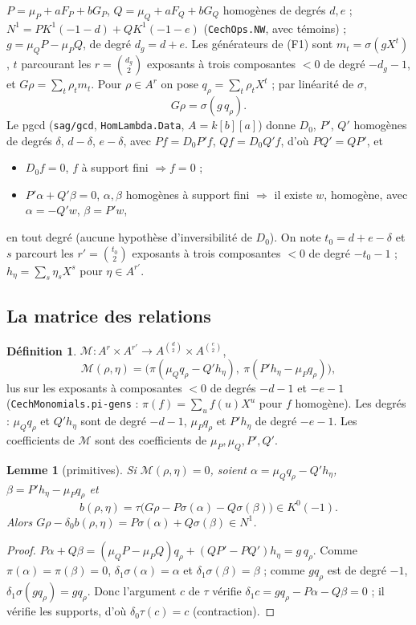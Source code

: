 \documentclass[11pt]{amsart}
\newtheorem{lemma}[theorem]{Lemme}
\theoremstyle{definition}
\newtheorem{definition}[theorem]{Définition}
\theoremstyle{remark}
\begin{document}
$P=\mu_P+aF_P+bG_P$, $Q=\mu_Q+aF_Q+bG_Q$ homogènes de degrés $d,e$ ;
$N^1=PK^1(-1-d)+QK^1(-1-e)$ (\texttt{CechOps.NW}, avec témoins) ;
$g=\mu_QP-\mu_PQ$, de degré $d_g=d+e$. Les générateurs de (F1) sont
$m_t=\sigma(gX^t)$, $t$ parcourant les $r=\binom{d_g}2$ exposants à trois
composantes $<0$ de degré $-d_g-1$, et $G\rho=\sum_t\rho_tm_t$. Pour
$\rho\in A^r$ on pose $q_\rho=\sum_t\rho_tX^t$ ; par linéarité de $\sigma$,
\[G\rho=\sigma(g\,q_\rho).\]
Le pgcd (\texttt{sag/gcd}, \texttt{HomLambda.Data}, $A=k[b][a]$) donne
$D_0$, $P'$, $Q'$ homogènes de degrés $\delta$, $d-\delta$, $e-\delta$,
avec $Pf=D_0P'f$, $Qf=D_0Q'f$, d'où $PQ'=QP'$, et
\begin{itemize}
\item[(S0)] $D_0f=0$, $f$ à support fini $\Rightarrow f=0$ ;
\item[(S1)] $P'\alpha+Q'\beta=0$, $\alpha,\beta$ homogènes à support fini
  $\Rightarrow$ il existe $w$, homogène, avec $\alpha=-Q'w$, $\beta=P'w$,
\end{itemize}
en tout degré (aucune hypothèse d'inversibilité de $D_0$). On note
$t_0=d+e-\delta$ et $s$ parcourt les $r'=\binom{t_0}2$ exposants à trois
composantes $<0$ de degré $-t_0-1$ ; $h_\eta=\sum_s\eta_sX^s$ pour
$\eta\in A^{r'}$.

\subsection{La matrice des relations}
\begin{definition}
$\mathcal M:A^r\times A^{r'}\to A^{\binom d2}\times A^{\binom e2}$,
\[\mathcal M(\rho,\eta)=\bigl(\pi(\mu_Qq_\rho-Q'h_\eta),\ \pi(P'h_\eta-\mu_Pq_\rho)\bigr),\]
lus sur les exposants à composantes $<0$ de degrés $-d-1$ et $-e-1$
(\texttt{CechMonomials.pi-gens} : $\pi(f)=\sum_uf(u)X^u$ pour $f$
homogène). Les degrés : $\mu_Qq_\rho$ et $Q'h_\eta$ sont de degré $-d-1$,
$\mu_Pq_\rho$ et $P'h_\eta$ de degré $-e-1$. Les coefficients de
$\mathcal M$ sont des coefficients de $\mu_P,\mu_Q,P',Q'$.
\end{definition}

\begin{lemma}[primitives]\label{lem:prim}
Si $\mathcal M(\rho,\eta)=0$, soient $\alpha=\mu_Qq_\rho-Q'h_\eta$,
$\beta=P'h_\eta-\mu_Pq_\rho$ et
\[b(\rho,\eta)=\tau\bigl(G\rho-P\sigma(\alpha)-Q\sigma(\beta)\bigr)\in K^0(-1).\]
Alors $G\rho-\delta_0b(\rho,\eta)=P\sigma(\alpha)+Q\sigma(\beta)\in N^1$.
\end{lemma}

\begin{proof}
$P\alpha+Q\beta=(\mu_QP-\mu_PQ)q_\rho+(QP'-PQ')h_\eta=g\,q_\rho$. Comme
$\pi(\alpha)=\pi(\beta)=0$, $\delta_1\sigma(\alpha)=\alpha$ et
$\delta_1\sigma(\beta)=\beta$ ; comme $gq_\rho$ est de degré $-1$,
$\delta_1\sigma(gq_\rho)=gq_\rho$. Donc l'argument $c$ de $\tau$ vérifie
$\delta_1c=gq_\rho-P\alpha-Q\beta=0$ ; il vérifie les supports, d'où
$\delta_0\tau(c)=c$ (contraction).
\end{proof}
\end{document}
